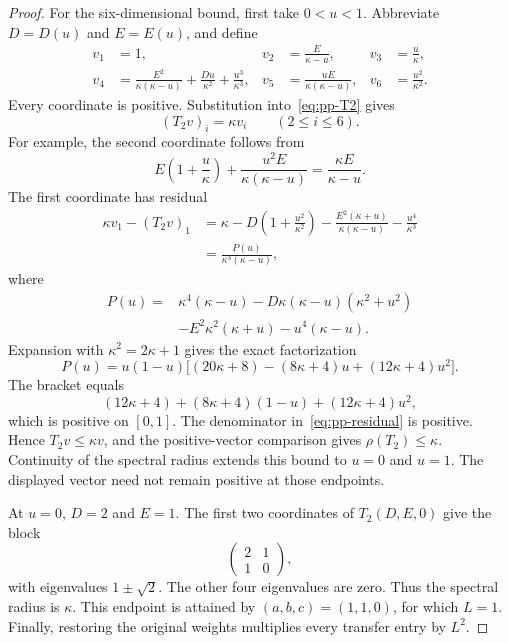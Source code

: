 \documentclass[11pt,a4paper]{article}
\theoremstyle{definition}
\theoremstyle{remark}
\begin{document}
\begin{proof}
For the six-dimensional bound, first take $0<u<1$.
Abbreviate $D=D(u)$ and $E=E(u)$, and define
\begin{equation}\label{eq:pp-positive-vector}
\begin{aligned}
v_1&=1,&
v_2&=\frac{E}{\kappa-u},&
v_3&=\frac{u}{\kappa},\\
v_4&=\frac{E^2}{\kappa(\kappa-u)}
       +\frac{Du}{\kappa^2}+\frac{u^3}{\kappa^3},&
v_5&=\frac{uE}{\kappa(\kappa-u)},&
v_6&=\frac{u^2}{\kappa^2}.
\end{aligned}
\end{equation}
Every coordinate is positive.
Substitution into~\eqref{eq:pp-T2} gives
\[
(T_2v)_i=\kappa v_i\qquad(2\le i\le6).
\]
For example, the second coordinate follows from
\[
E\left(1+\frac u\kappa\right)
+\frac{u^2E}{\kappa(\kappa-u)}
=\frac{\kappa E}{\kappa-u}.
\]
The first coordinate has residual
\begin{equation}\label{eq:pp-residual}
\begin{aligned}
\kappa v_1-(T_2v)_1
&=\kappa-D\left(1+\frac{u^2}{\kappa^2}\right)
 -\frac{E^2(\kappa+u)}{\kappa(\kappa-u)}-\frac{u^4}{\kappa^3}\\
&=\frac{P(u)}{\kappa^3(\kappa-u)},
\end{aligned}
\end{equation}
where
\[
\begin{aligned}
P(u)={}&\kappa^4(\kappa-u)
-D\kappa(\kappa-u)(\kappa^2+u^2)\\
&-E^2\kappa^2(\kappa+u)-u^4(\kappa-u).
\end{aligned}
\]
Expansion with $\kappa^2=2\kappa+1$ gives the exact factorization
\begin{equation}\label{eq:pp-residual-factorization}
P(u)=u(1-u)
\bigl[(20\kappa+8)-(8\kappa+4)u+(12\kappa+4)u^2\bigr].
\end{equation}
The bracket equals
\[
(12\kappa+4)+(8\kappa+4)(1-u)+(12\kappa+4)u^2,
\]
which is positive on $[0,1]$.
The denominator in~\eqref{eq:pp-residual} is positive.
Hence $T_2v\le\kappa v$, and the positive-vector comparison gives $\rho(T_2)\le\kappa$.
Continuity of the spectral radius extends this bound to $u=0$ and $u=1$.
The displayed vector need not remain positive at those endpoints.

At $u=0$, $D=2$ and $E=1$.
The first two coordinates of $T_2(D,E,0)$ give the block
\[
\begin{pmatrix}2&1\\1&0\end{pmatrix},
\]
with eigenvalues $1\pm\sqrt2$.
The other four eigenvalues are zero.
Thus the spectral radius is $\kappa$.
This endpoint is attained by $(a,b,c)=(1,1,0)$, for which $L=1$.
Finally, restoring the original weights multiplies every transfer entry by $L^2$.
\end{proof}
\end{document}
